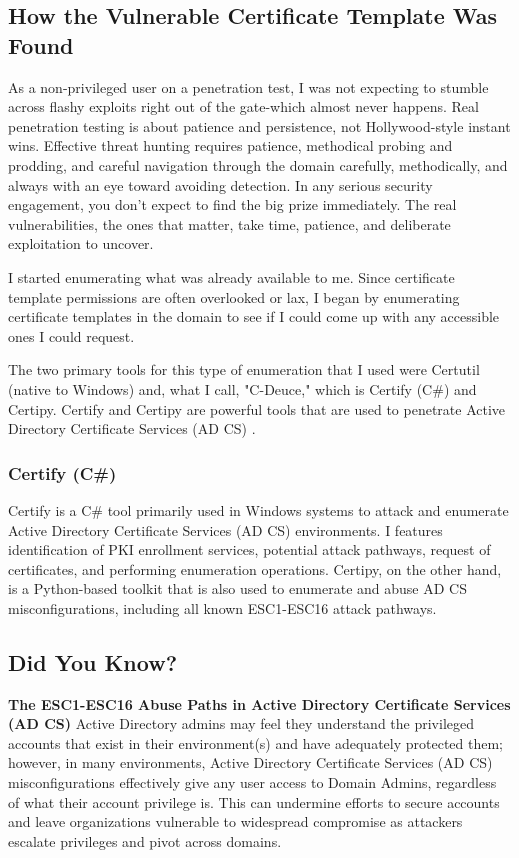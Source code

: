{\subsection{How the Vulnerable Certificate Template Was Found}
As a non-privileged user on a penetration test, I was not expecting to stumble across flashy exploits right out of the gate-which almost never happens. Real penetration testing is about patience and persistence, not Hollywood-style instant wins. Effective threat hunting requires patience, methodical probing and prodding, and careful navigation through the domain carefully, methodically, and always with an eye toward avoiding detection. In any serious security engagement, you don't expect to find the big prize immediately. The real vulnerabilities, the ones that matter, take time, patience, and deliberate exploitation to uncover.

I started enumerating what was already available to me. Since certificate template permissions are often overlooked or lax, I began by enumerating certificate templates in the domain to see if I could come up with any accessible ones I could request.

The two primary tools for this type of enumeration that I used were Certutil (native to Windows) and, what I call, "C-Deuce," which is Certify (C\#) and Certipy.  Certify and Certipy are powerful tools that are used to penetrate Active Directory Certificate Services (AD CS) .

\subsubsection{Certify (C\#)}
Certify is a C# tool primarily used in Windows systems to attack and enumerate Active Directory Certificate Services (AD CS) environments. I features identification of PKI enrollment services, potential attack pathways, request of certificates, and performing enumeration operations. Certipy, on the other hand, is a Python-based toolkit that is also used to enumerate and abuse AD CS misconfigurations, including all known ESC1-ESC16 attack pathways.

\subsection{Did You Know?}
\textbf{The ESC1-ESC16 Abuse Paths in Active Directory Certificate Services (AD CS)}
Active Directory admins may feel they understand the privileged accounts that exist in their environment(s) and have adequately protected them; however, in many environments, Active Directory Certificate Services (AD CS) misconfigurations effectively give any user access to Domain Admins, regardless of what their account privilege is. This can undermine efforts to secure accounts and leave organizations vulnerable to widespread compromise as attackers escalate privileges and pivot across domains.

}
